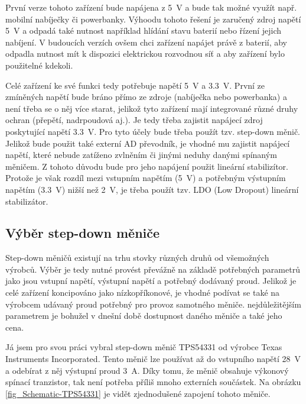 První verze tohoto zařízení bude napájena z \SI{5}{\volt} a bude tak možné využít např. mobilní nabíječky či powerbanky. Výhoodu tohoto řešení je zaručený zdroj napětí \SI{5}{\volt} a odpadá také nutnost například hlídání stavu baterií nebo řízení jejich nabíjení. V budoucích verzích ovšem chci zařízení napájet právě z baterií, aby odpadla nutnost mít k dispozici elektrickou rozvodnou síť a aby zařízení bylo použitelné kdekoli.

Celé zařízení ke své funkci tedy potřebuje napětí \SI{5}{\volt} a \SI{3,3}{\volt}. První ze zmíněných napětí bude bráno přímo ze zdroje (nabíječka nebo powerbanka) a není třeba se o něj více starat, jelikož tyto zařízení mají integrované různé druhy ochran (přepětí, nadrpoudová aj.). Je tedy třeba zajistit napájecí zdroj poskytující napětí \SI{3,3}{\volt}. Pro tyto účely bude třeba použít tzv. step-down měnič. Jelikož bude použit také externí AD převodník, je vhodné mu zajistit napájecí napětí, které nebude zatíženo zvlněním či jinými neduhy danými spínaným měničem. Z tohoto důvodu bude pro jeho napájení použit lineární stabilizítor. Protože je však rozdíl mezi vstupním napětím (\SI{5}{\volt}) a potřebným výstupním napětím (\SI{3,3}{\volt}) nižší než \SI{2}{\volt}, je třeba použít tzv. LDO (Low Dropout) lineární stabilizátor.

\subsection{Výběr step-down měniče}

Step-down měničů existují na trhu stovky různých druhů od všemožných výrobců. Výběr je tedy nutné provést převážně na základě potřebných parametrů jako jsou vstupní napětí, výstupní napětí a potřebný dodávaný proud. Jelikož je celé zařízení koncipováno jako nízkopříkonové, je vhodné podívat se také na výrobcem udávaný proud potřebný pro provoz samotného měniče. nejdůležitějším parametrem je bohužel v dnešní době dostupnost daného měniče a také jeho cena.

Já jsem pro svou práci vybral step-down měnič TPS54331 od výrobce Texas Instruments Incorporated\cite{dat_TPS54331}. Tento měnič lze používat až do vstupního napětí \SI{28}{\volt} a odebírat z něj výstupní proud \SI{3}{\ampere}. Díky tomu, že měnič obsahuje výkonový spínací tranzistor, tak není potřeba příliš mnoho externích součástek. Na obrázku \ref{fig_Schematic-TPS54331} je vidět zjednodušené zapojení tohoto měniče.

